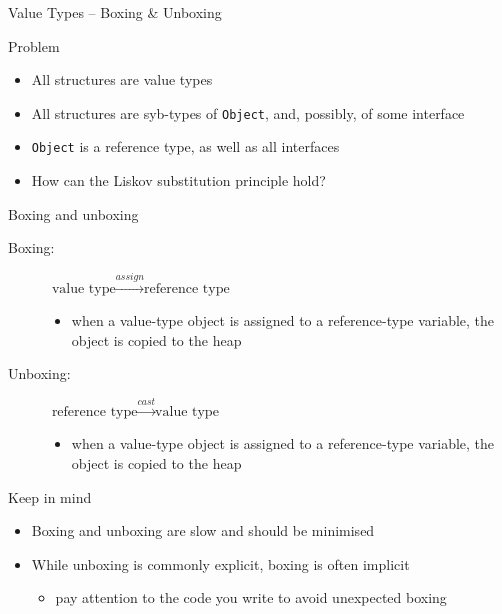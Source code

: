 \documentclass[presentation]{beamer}
\begin{document}
\begin{frame}[allowframebreaks]{Value Types -- Boxing \& Unboxing}
  \begin{block}{Problem}
    \begin{itemize}
      \item All structures are value types
      \item All structures are syb-types of \texttt{Object}, and, possibly, of some interface
      \item \texttt{Object} is a reference type, as well as all interfaces
      \item How can the Liskov substitution principle hold?
    \end{itemize}
  \end{block}

  \begin{exampleblock}{Boxing and unboxing}
    \begin{description}
      \item[Boxing:] $\text{value type} \xrightarrow{assign} \text{reference type}$
      \begin{itemize}
        \item when a value-type object is \alert{assigned} to a reference-type variable, the object is \alert{copied to the heap}
      \end{itemize} 
      \item[Unboxing:] $\text{reference type} \xrightarrow{cast} \text{value type}$
      \begin{itemize}
        \item when a value-type object is \alert{assigned} to a reference-type variable, the object is \alert{copied to the heap}
      \end{itemize}  
    \end{description}
  \end{exampleblock}

  \begin{alertblock}{Keep in mind}
    \begin{itemize}
      \item Boxing and unboxing are \alert{slow} and should be minimised
      \item While unboxing is commonly explicit, boxing is often implicit
      \begin{itemize}
        \item pay attention to the code you write to avoid unexpected boxing
      \end{itemize}
    \end{itemize}
  \end{alertblock}


\end{frame}
\end{document}
